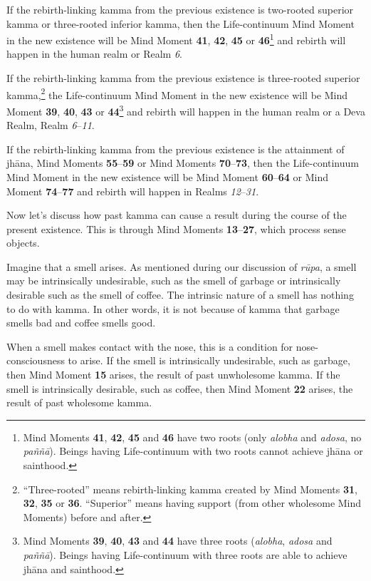 If the rebirth-linking kamma from the previous existence is two-rooted superior kamma or three-rooted inferior kamma, then the Life-continuum Mind Moment in the new existence will be Mind Moment \textbf{41}, \textbf{42}, \textbf{45} or \textbf{46}\footnote{Mind Moments \textbf{41}, \textbf{42}, \textbf{45} and \textbf{46} have two roots (only \textit{alobha} and \textit{adosa}, no \textit{paññā}). Beings having Life-continuum with two roots cannot achieve jhāna or sainthood.} and rebirth will happen in the human realm or Realm \textit{6}. 

If the rebirth-linking kamma from the previous existence is three-rooted superior kamma,\footnote{“Three-rooted” means rebirth-linking kamma created by Mind Moments \textbf{31}, \textbf{32}, \textbf{35} or \textbf{36}. “Superior” means having support (from other wholesome Mind Moments) before and after.} the Life-continuum Mind Moment in the new existence will be Mind Moment \textbf{39}, \textbf{40}, \textbf{43} or \textbf{44}\footnote{Mind Moments \textbf{39}, \textbf{40}, \textbf{43} and \textbf{44} have three roots (\textit{alobha}, \textit{adosa} and \textit{paññā}). Beings having Life-continuum with three roots are able to achieve jhāna and sainthood.} and rebirth will happen in the human realm or a Deva Realm, Realm \textit{6}--\textit{11}.

If the rebirth-linking kamma from the previous existence is the attainment of jhāna, Mind Moments \textbf{55}--\textbf{59} or Mind Moments \textbf{70}--\textbf{73}, then the Life-continuum Mind Moment in the new existence will be Mind Moment \textbf{60}--\textbf{64} or Mind Moment \textbf{74}--\textbf{77} and rebirth will happen in Realms \textit{12}--\textit{31}.

Now let’s discuss how past kamma can cause a result during the course of the present existence. This is through Mind Moments \textbf{13}--\textbf{27}, which process sense objects.

Imagine that a smell arises. As mentioned during our discussion of \textit{rūpa}, a smell may be intrinsically undesirable, such as the smell of garbage or intrinsically desirable such as the smell of coffee. The intrinsic nature of a smell has nothing to do with kamma. In other words, it is not because of kamma that garbage smells bad and coffee smells good.

When a smell makes contact with the nose, this is a condition for nose-consciousness to arise. If the smell is intrinsically undesirable, such as garbage, then Mind Moment \textbf{15} arises, the result of past unwholesome kamma. If the smell is intrinsically desirable, such as coffee, then Mind Moment \textbf{22} arises, the result of past wholesome kamma.

